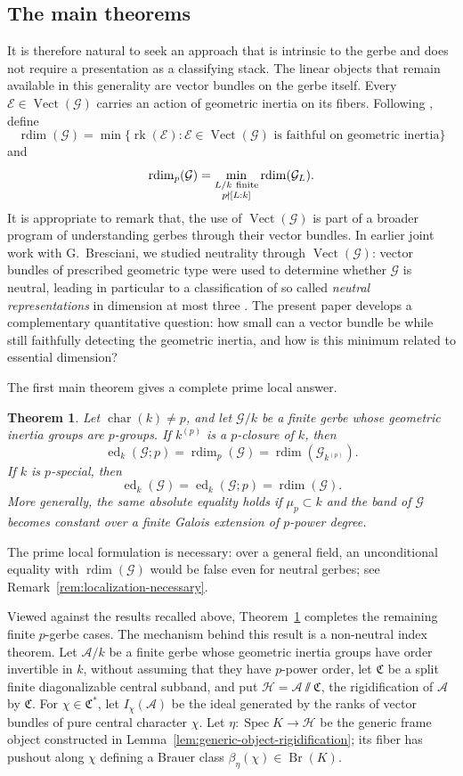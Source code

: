 \documentclass[11pt,reqno]{amsart}
\numberwithin{equation}{section}
\theoremstyle{plain}
\newtheorem{theo}[prop]{Theorem}
\theoremstyle{definition}
\def\cA{{\mathcal A}}
\def\cG{{\mathcal G}}
\def\cH{{\mathcal H}}
\def\cE{{\mathcal E}}
\def\fC{{\mathfrak C}}
\def\Br{{\operatorname{Br}}}
\def\rk{{\operatorname{rk}}}
\def\Spec{{\operatorname{Spec}}}
\def\Vect{{\operatorname{Vect}}}
\def\rdim{{\operatorname{rdim}}}
\def\ed{{\operatorname{ed}}}
\begin{document}
\subsection{The main theorems}
It is therefore natural to seek an approach that is intrinsic to the gerbe and does not require a presentation as a classifying stack. The linear objects that remain available in this generality are vector bundles on the gerbe itself. Every $\cE\in\Vect(\cG)$ carries an action of geometric inertia on its
fibers. Following
\cite[Definition~3.0.4]{BraggLieblich}, define
\[
\rdim(\cG)=
\min\{\rk(\cE):\cE\in\Vect(\cG)
       \text{ is faithful on geometric inertia}\}
\]
and
\[
\rdim_p(\cG)=
\min_{\substack{L/k\ {\rm finite}\\p\nmid[L:k]}}\rdim(\cG_L).
\]
It is appropriate to remark that, the use of $\Vect(\cG)$ is part of a broader program of understanding
gerbes through their vector bundles.  In earlier joint work with
G.~Bresciani, we studied neutrality through $\Vect(\cG)$: vector bundles of
prescribed geometric type were used to determine whether $\cG$ is neutral,
leading in particular to a classification of so called \emph{neutral
representations} in dimension at most three
\cite{BrescianiYangNeutral}.  The present paper develops a complementary
quantitative question: how small can a vector bundle be while still
faithfully detecting the geometric inertia, and how is this minimum related
to essential dimension?

The first main theorem gives a complete prime local answer.

\begin{theo}\label{thm:intro-main}
Let $\operatorname{char}(k)\ne p$, and let $\cG/k$ be a finite gerbe
whose geometric inertia groups are $p$-groups.  If $k^{(p)}$ is a
$p$-closure of $k$, then
\[
\ed_k(\cG;p)
=\rdim_p(\cG)
=\rdim(\cG_{k^{(p)}}).
\]
If $k$ is $p$-special, then
\[
\ed_k(\cG)=\ed_k(\cG;p)=\rdim(\cG).
\]
More generally, the same absolute equality holds if
$\mu_p\subset k$ and the band of $\cG$ becomes constant over a finite
Galois extension of $p$-power degree.
\end{theo}

The prime local formulation is necessary: over a general field, an
unconditional equality with $\rdim(\cG)$ would be false even for neutral
gerbes; see Remark~\ref{rem:localization-necessary}.

Viewed against the results recalled above, Theorem~\ref{thm:intro-main} completes the remaining finite $p$-gerbe cases. The mechanism behind this result is a non-neutral index theorem. Let $\cA/k$ be a finite
gerbe whose geometric inertia groups have order invertible in $k$, without
assuming that they have $p$-power order, let $\fC$ be a split finite
diagonalizable central subband, and put $\cH=\cA\sslash\fC$, the rigidification of $\cA$ by $\fC$. For
$\chi\in\fC^*$, let $I_\chi(\cA)$ be the ideal generated by the ranks of
vector bundles of pure central character $\chi$.  Let
$\eta:\Spec K\to\cH$ be the generic frame object constructed in
Lemma~\ref{lem:generic-object-rigidification}; its fiber has pushout along
$\chi$ defining a Brauer class $\beta_\eta(\chi)\in\Br(K)$.
\end{document}
